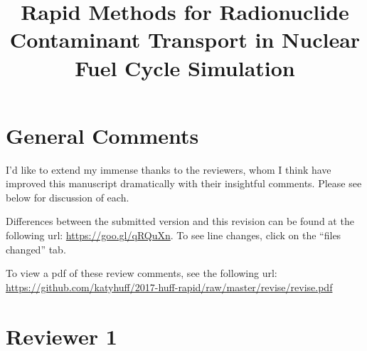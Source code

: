 \documentclass[answers,12pt]{exam}
\begin{document}



\title{Rapid Methods for Radionuclide Contaminant Transport in Nuclear Fuel 
        Cycle Simulation}



%

\section*{General Comments}
I'd like to extend my immense thanks to the reviewers, whom I think have
improved this manuscript dramatically with their insightful comments. Please
see below for discussion of each.  

Differences between the submitted version and this revision can be found at the 
following url: \url{https://goo.gl/qRQuXn}. To see line changes, click on the 
``files changed'' tab.

To view a pdf of these review comments, see the following url:
\url{https://github.com/katyhuff/2017-huff-rapid/raw/master/revise/revise.pdf}

\section*{Reviewer 1}
\end{document}
